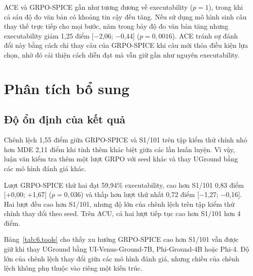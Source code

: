 ACE và GRPO-SPICE gần như tương đương về executability ($p = 1$), trong khi cả sáu độ đo văn bản có khoảng tin cậy đều tăng. Nếu sử dụng mô hình sinh câu thay thế trực tiếp cho mọi bước, năm trong bảy độ đo văn bản tăng nhưng executability giảm 1,25 điểm [$-$2,06; $-$0,44] ($p = 0{,}0016$). ACE tránh sự đánh đổi này bằng cách chỉ thay câu của GRPO-SPICE khi câu mới thỏa điều kiện lựa chọn, nhờ đó cải thiện cách diễn đạt mà vẫn giữ gần như nguyên executability.

\section{Phân tích bổ sung}\label{sec:6.7}\label{sec:6.7.1}\label{sec:6.7.2}\label{sec:6.9}

\subsection{Độ ổn định của kết quả}\label{sec:6.7.3}

Chênh lệch 1,55 điểm giữa GRPO-SPICE và S1/101 trên tập kiểm thử chính nhỏ hơn MDE 2,11 điểm khi tính thêm khác biệt giữa các lần huấn luyện. Vì vậy, luận văn kiểm tra thêm một lượt GRPO với seed khác và thay UGround bằng các mô hình đánh giá khác.

Lượt GRPO-SPICE thứ hai đạt 59,94\% executability, cao hơn S1/101 0,83 điểm [+0,00; +1,67] ($p = 0{,}036$) và thấp hơn lượt thứ nhất 0,72 điểm [$-$1,27; $-$0,16]. Hai lượt đều cao hơn S1/101, nhưng độ lớn của chênh lệch trên tập kiểm thử chính thay đổi theo seed. Trên ACU, cả hai lượt tiếp tục cao hơn S1/101 hơn 4 điểm.

Bảng~\ref{tab:6.tools} cho thấy xu hướng GRPO-SPICE cao hơn S1/101 vẫn được giữ khi thay UGround bằng UI-Venus-Ground-7B, Phi-Ground-4B hoặc Phi-4. Độ lớn của chênh lệch thay đổi giữa các mô hình đánh giá, nhưng chiều của chênh lệch không phụ thuộc vào riêng một kiến trúc.

